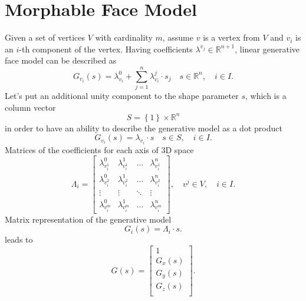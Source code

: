 \section{Morphable Face Model}

Given a set of vertices $V$ with cardinality $m$,
assume $v$ is a vertex from $V$
and $v_i$ is an $i$-th component of the vertex.
Having coefficients $\lambda^{v_j} \in \mathbb{R}^{n + 1}$,
linear generative face model can be described as
\begin{equation*}
  G_{v_i}\left( s \right)
  = \lambda^0_{v_i} + \sum_{j = 1}^{n} \lambda^j_{v_i} \cdot s_j
  \quad s \in \mathbb{R}^n,
  \quad i \in I.
\end{equation*}
Let's put an additional unity component to the shape parameter $s$,
which is a column vector
\begin{equation*}
  S = \left\{ 1 \right\} \times \mathbb{R}^n
\end{equation*}
in order to have an ability to describe
the generative model as a dot product
\begin{equation*}
  G_{v_i}\left( s \right)
  = \lambda_{v_i} \cdot s
  \quad s \in S,
  \quad i \in I.
\end{equation*}
Matrices of the coefficients for each axis of 3D space
\begin{equation*}
  \Lambda_i = \begin{bmatrix}
    \lambda^0_{v_i^1} & \lambda^1_{v_i^1} & \dots  & \lambda^n_{v_i^1} \\
    \lambda^0_{v_i^2} & \lambda^1_{v_i^2} & \dots  & \lambda^n_{v_i^2} \\
    \vdots            & \vdots            & \ddots & \vdots            \\
    \lambda^0_{v_i^m} & \lambda^1_{v_i^m} & \dots  & \lambda^n_{v_i^m}
  \end{bmatrix},
  \quad v^j \in V,
  \quad i \in I.
\end{equation*}
Matrix representation of the generative model
\begin{equation*}
  G_i\left( s \right) = \Lambda_i \cdot s.
\end{equation*}
leads to
\begin{equation*}
  G\left( s \right)
  = \begin{bmatrix}
    1 \\
    G_x\left( s \right) \\
    G_y\left( s \right) \\
    G_z\left( s \right) \\
  \end{bmatrix}.
\end{equation*}
